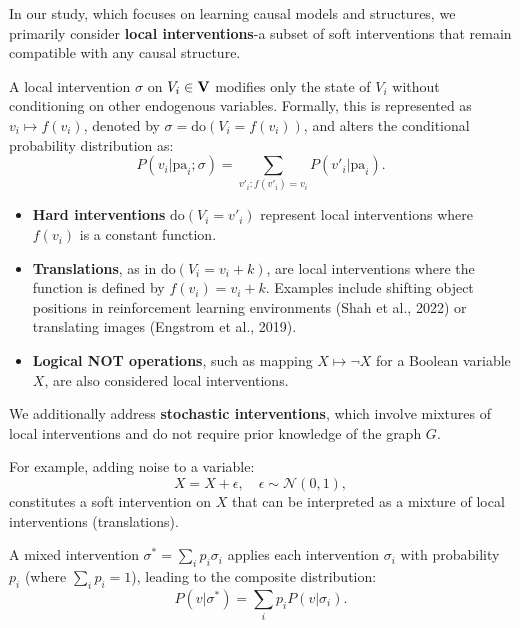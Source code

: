In our study, which focuses on learning causal models and structures, we primarily consider \textbf{local interventions}-a subset of soft interventions that remain compatible with any causal structure.

\begin{definition}
	A local intervention \(\sigma\) on \(V_i \in \mathbf{V}\) modifies only the state of \(V_i\) without conditioning on other endogenous variables. Formally, this is represented as \(v_i \mapsto f(v_i)\), denoted by \(\sigma = \text{do}(V_i = f(v_i))\), and alters the conditional probability distribution as:
	\begin{equation}
		P(v_i|\text{pa}_i; \sigma) = \sum_{v'_i: f(v'_i) = v_i} P(v'_i|\text{pa}_i).
	\end{equation}
\end{definition}

\begin{itemize}
	\item \textbf{Hard interventions} \(\text{do}(V_i = v'_i)\) represent local interventions where \(f(v_i)\) is a constant function.
	\item \textbf{Translations}, as in \(\text{do}(V_i = v_i + k)\), are local interventions where the function is defined by \(f(v_i) = v_i + k\). Examples include shifting object positions in reinforcement learning environments (Shah et al., 2022) or translating images (Engstrom et al., 2019).
	\item \textbf{Logical NOT operations}, such as mapping \(X \mapsto \neg X\) for a Boolean variable \(X\), are also considered local interventions.
\end{itemize}

We additionally address \textbf{stochastic interventions}, which involve mixtures of local interventions and do not require prior knowledge of the graph \(G\).

For example, adding noise to a variable:
\begin{equation*}
	X = X + \epsilon, \quad \epsilon \sim \mathcal{N}(0,1),
\end{equation*}
constitutes a soft intervention on \(X\) that can be interpreted as a mixture of local interventions (translations).

\begin{definition}
	A mixed intervention \(\sigma^* = \sum_i p_i \sigma_i\) applies each intervention \(\sigma_i\) with probability \(p_i\) (where \(\sum_i p_i = 1\)), leading to the composite distribution:
	\begin{equation*}
		P(v|\sigma^*) = \sum_i p_i P(v|\sigma_i).
	\end{equation*}
\end{definition}
